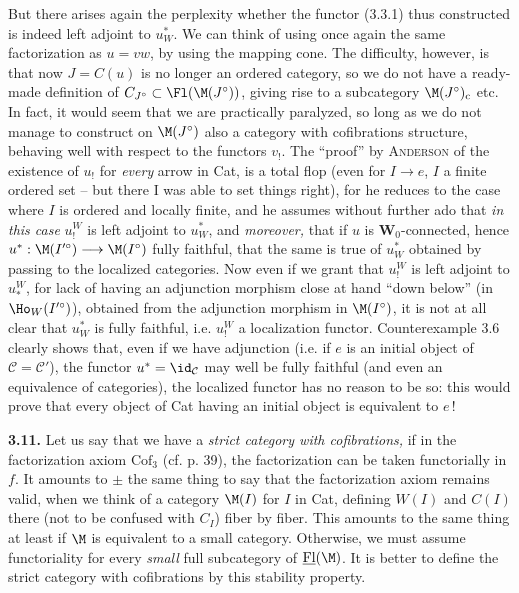 But there arises again the perplexity whether the functor (3.3.1) thus constructed is indeed left adjoint to $u_W^*$. We can think of using once again the same factorization as $u = vw$, by
using the mapping cone. The difficulty, however, is that now $J = C(u)$ is no longer an ordered category, so we do not have a ready-made definition of $C_{J^\circ}\subset\Fl(\M(J^\circ))$, giving rise to a subcategory $\M(J^\circ)_{\mathrm{c}}$ etc. In fact, it would seem that we are practically paralyzed, so long as we do not manage to construct on $\M(J^\circ)$ also a category with cofibrations structure, behaving well with respect to the functors $v_!$. The %
``proof'' by \textsc{Anderson} of the existence of $u_!$ for \textit{every} arrow in Cat, is a total flop (even for $I\longrightarrow e$, $I$ a finite ordered set – but there I was able to set things right), for he reduces to the case where $I$ is ordered and locally finite, and he
assumes without further ado that \textit{in this case} $u_!^W$ is left adjoint to $u_W^*$, and \textit{moreover,} that if $u$ is $\mathbf{W}_0$-connected, hence $u^* : \M(I'^\circ)\longrightarrow\M(I^\circ)$ fully faithful, that the same is true of $u_W^*$ obtained by passing to the localized categories. Now even if we grant that $u_!^W$ is left adjoint to
$u_*^W$, for lack of having an adjunction morphism close at hand ``down below'' (in $\Ho_W(I'^\circ)$), %
obtained from the adjunction morphism in $\M(I^\circ)$, it is not at all clear that $u_W^*$ is fully faithful, i.e. $u_!^W$ a localization functor. Counterexample 3.6 clearly shows that, even if we have adjunction (i.e. if $e$ is an initial object of $\mathcal{C} = \mathcal{C}'$), the functor $u^* = \id_{\mathcal{C}}$ may well be fully faithful (and even an equivalence of categories), the localized functor has no reason to be so: this would prove that every object of Cat having an initial object %
is equivalent to $e$\,!

\textbf{3.11.} Let us say that we have a \textit{strict category with cofibrations,} if in the factorization axiom $\mathrm{Cof}_3$ (cf. p. 39), the factorization can be taken functorially in $f$. It amounts to $\pm$ the same thing to say that the factorization axiom remains valid, when we think of a category $\M(I)$ for $I$ in Cat, defining $W(I)$ and $C(I)$ there (not to be confused with $C_I$) fiber by fiber. This amounts to the same thing at least if $\M$ is equivalent to a small category. Otherwise, we must assume functoriality for every \textit{small} full subcategory of $\underline{\mathrm{Fl}}(\M)$. It is better to define the strict category with cofibrations by this stability property.

